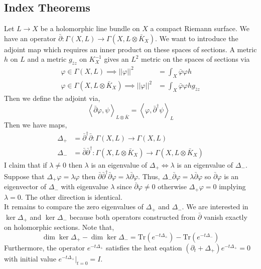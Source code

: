 \documentclass[12pt]{extarticle}
\newcommand{\Tr}[1]{\mathrm{Tr}\left( #1 \right)}
\theoremstyle{definition}
\begin{document}
\subsection{Index Theorems}

Let $L \to X$ be a holomorphic line bundle on $X$ a compact Riemann surface. We have an operator $\bar{\partial} : \Gamma(X, L) \to \Gamma(X, L \otimes \bar{K}_X)$. We want to introduce the adjoint map which requires an inner product on these spaces of sections. A metric $h$ on $L$ and a metric $g_{\bar{z}z}$ on $K_X^{-1}$ gives an $L^2$ metric on the spaces of sections via
\begin{align*}
\varphi \in \Gamma(X, L) \implies ||\varphi||^2 & = \int_X \bar{\varphi} \varphi h 
\\
\varphi \in \Gamma(X, L \otimes \bar{K}_X) \implies ||\varphi||^2 & =\int_X \bar{\varphi} \varphi h g_{\bar{z} z} 
\end{align*}
Then we define the adjoint via,
\[ \left< \bar{\partial} \varphi, \psi \right>_{L \otimes \bar{K}} = \left< \varphi, \bar{\partial}^\dagger \psi \right>_L \]
Then we have maps,
\begin{align*}
\Delta_+ & = \bar{\partial}^\dagger \bar{\partial} : \Gamma(X, L) \to \Gamma(X, L)
\\
\Delta_{-} & = \bar{\partial} \bar{\partial}^\dagger : \Gamma(X, L \otimes \bar{K}_X) \to \Gamma(X, L \otimes \bar{K}_X)
\end{align*} 
I claim that if $\lambda \neq 0$ then $\lambda$ is an eigenvalue of $\Delta_{+} \iff \lambda$ is an eigenvalue of $\Delta_{-}$. 
Suppose that $\Delta_{+} \varphi = \lambda \varphi$ then $\bar{\partial} \bar{\partial}^\dagger \bar{\partial} \varphi = \lambda \bar{\partial} {\varphi}$. Thus, $\Delta_{-} \bar{\partial} \varphi = \lambda \bar{\partial} \varphi$ so $\bar{\partial} \varphi$ is an eigenvector of $\Delta_{-}$ with eigenvalue $\lambda$ since $\bar{\partial} \varphi \neq 0$ otherwise $\Delta_+ \varphi = 0$ implying $\lambda = 0$. The other direction is identical. 
\bigskip\\
It remains to compare the zero eigenvalues of $\Delta_{+}$ and $\Delta_{-}$. We are interested in $\ker{\Delta_{+}}$ and $\ker{\Delta_{-}}$ because both operators constructed from $\bar{\partial}$ vanish exactly on holomorphic sections. Note that,
\[ \dim{\ker{\Delta_{+}}} - \dim{\ker{\Delta_{-}}} = \Tr{e^{-t \Delta_{+}}} - \Tr{e^{- t \Delta_{-}}} \]
Furthermore, the operator $e^{-t \Delta_{+}}$ satisfies the heat eqation $(\partial_t + \Delta_+ ) e^{-t \Delta_{+}} = 0$ with initial value $e^{-t \Delta_{+}} |_{t = 0} = I$. 
\end{document}
